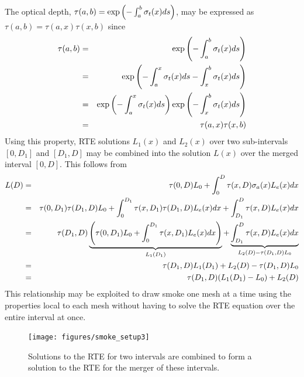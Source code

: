 The optical depth, $\tau(a,b)=\exp\left(-\int_a^b \sigma_t(x) ds\right)$, may be expressed as $\tau(a,b)=\tau(a,x)\tau(x,b)$ since
\begin{eqnarray*}
\tau(a,b)&=&\exp\left(-\int_a^b \sigma_t(x) ds\right)\\
&=&\exp\left(-\int_a^x \sigma_t(x) ds -\int_x^b \sigma_t(x) ds\right)\\
&=&\exp\left(-\int_a^x \sigma_t(x) ds\right)\exp\left(-\int_x^b \sigma_t(x) ds\right)\\
&=&\tau(a,x)\tau(x,b)
\end{eqnarray*}
Using this property, RTE solutions $L_1(x)$ and $L_2(x)$ over two sub-intervals $[0,D_1]$ and $[D_1,D]$ may be combined into the solution $L(x)$ over the merged
interval $[0,D]$.  This follows from
\begin{eqnarray*}
L(D)&=&\tau(0,D)L_0 + \int_0^D\tau(x,D)\sigma_a(x)L_e(x) dx\\
&=&\tau(0,D_1)\tau(D_1,D)L_0 + \int_0^{D_1}\tau(x,D_1)\tau(D_1,D)L_e(x) dx + \int_{D_1}^{D}\tau(x,D)L_e(x) dx\\
&=&\tau(D_1,D)
\underbrace{\left(\tau(0,D_1)L_0 + \int_0^{D_1}\tau(x,D_1)L_e(x) dx\right)}_{L_1(D_1)} +
\underbrace{\int_{D_1}^{D}\tau(x,D)L_e(x) dx}_{L_2(D)-\tau(D_1,D)L_0}\\
&=&\tau(D_1,D)L_1(D_1)+L_2(D)-\tau(D_1,D)L_0\\
&=&\tau(D_1,D)(L_1(D_1)-L_0) + L_2(D)
\end{eqnarray*}
This relationship may be exploited to draw smoke one mesh at a time using the properties local to each mesh without having to solve the RTE equation over the entire interval at once.

\begin{figure}[\figoptions]
\begin{center}
\texttt{[image: figures/smoke\_setup3]}
\end{center}
\caption {Solutions to the RTE for two intervals are combined to form a solution to the RTE
for the merger of these intervals.
}
\label{figsmokesetup3}
\end{figure}
